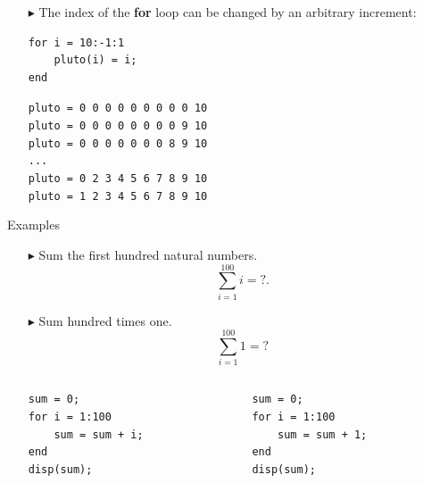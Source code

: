 \documentclass[aspectratio=169]{beamer}
\begin{document}
\begin{frame}[fragile]{}
    \begin{itemize}
        \item[$\blacktriangleright$]
        The index of the \textbf{for} loop can be changed by an \alert{arbitrary increment}:
        \begin{verbatim}
for i = 10:-1:1
    pluto(i) = i;
end
        \end{verbatim}
        \texttt{pluto = 0 0 0 0 0 0 0 0 0 10} \\
        \texttt{pluto = 0 0 0 0 0 0 0 0 9 10} \\
        \texttt{pluto = 0 0 0 0 0 0 0 8 9 10} \\
        \texttt{...} \\
        \texttt{pluto = 0 2 3 4 5 6 7 8 9 10} \\
        \texttt{pluto = 1 2 3 4 5 6 7 8 9 10}
    \end{itemize}
\end{frame}

\begin{frame}[fragile]{Examples}
    \begin{itemize}
        \item[$\blacktriangleright$]
        Sum the first hundred natural numbers.
        \begin{equation*}
            \sum_{i = 1}^{100} i = ?.
        \end{equation*}
        
        \item[$\blacktriangleright$]
        Sum hundred times one.
        \begin{equation*}
            \sum_{i=1}^{100} 1 = ?
        \end{equation*}
        
        \begin{columns}
            \begin{column}{0.5\textwidth}
                \begin{verbatim}
sum = 0;
for i = 1:100
    sum = sum + i;
end
disp(sum);
                \end{verbatim}
            \end{column}
            \begin{column}{0.5\textwidth}
                \begin{verbatim}
sum = 0;
for i = 1:100
    sum = sum + 1;
end
disp(sum);
                \end{verbatim}
            \end{column}
        \end{columns}
    \end{itemize}
\end{frame}
\end{document}
